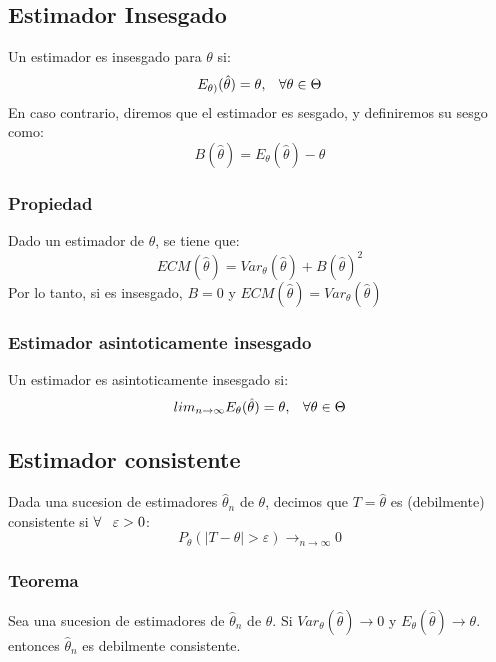 \documentclass[titlepage,a4paper]{article}
\begin{document}
\subsection{Estimador Insesgado}
Un estimador es insesgado para $\theta$ si:
\begin{equation*}
    E_{\theta)}(\hat{\theta}) = \theta, \hspace{8px} \forall \theta \in \Theta
\end{equation*} 
En caso contrario, diremos que el estimador es sesgado, y definiremos su sesgo como:
\begin{equation*}
    B(\hat{\theta}) = E_{\theta}(\hat{\theta}) - \theta
\end{equation*}
\subsubsection{Propiedad}
Dado un estimador de $\theta$, se tiene que:
\begin{equation*}
    ECM(\hat{\theta}) = Var_{\theta}(\hat{\theta}) + B(\hat{\theta})^{2}
\end{equation*}
Por lo tanto, si es insesgado, $B = 0$ y $ECM(\hat{\theta}) =  Var_{\theta}(\hat{\theta})$
\subsubsection{Estimador asintoticamente insesgado}
Un estimador es asintoticamente insesgado si:
\begin{equation*}
    lim_{n\rightarrow \infty} E_{\theta}(\hat{\theta}) = \theta, \hspace{8px} \forall \theta \in \Theta
\end{equation*}
\subsection{Estimador consistente}
Dada una sucesion de estimadores $\hat{\theta}_{n}$ de $\theta$, decimos que $T=\hat{\theta}$ es (debilmente) consistente si $\forall \hspace{8px}\varepsilon > 0$:
\begin{equation*}
    P_{\theta}(|T - \theta| > \varepsilon) \rightarrow_{n\rightarrow \infty} 0
\end{equation*}
\subsubsection{Teorema}
Sea una sucesion de estimadores de $\hat{\theta}_{n}$ de $\theta$. Si $Var_{\theta}(\hat{\theta}) \rightarrow 0$ y $E_{\theta}(\hat{\theta}) \rightarrow \theta$.
entonces $\hat{\theta}_{n}$ es debilmente consistente.
\end{document}
